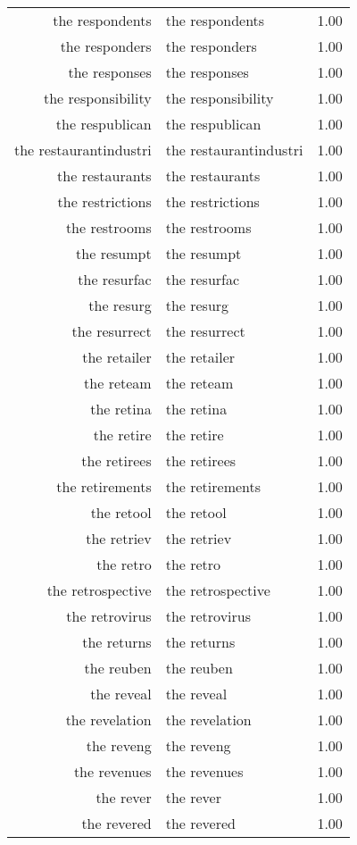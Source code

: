 \begin{table}[ht]
\begin{tabular}{rlr}
  the respondents & the respondents & 1.00 \\ 
  the responders & the responders & 1.00 \\ 
  the responses & the responses & 1.00 \\ 
  the responsibility & the responsibility & 1.00 \\ 
  the respublican & the respublican & 1.00 \\ 
  the restaurantindustri & the restaurantindustri & 1.00 \\ 
  the restaurants & the restaurants & 1.00 \\ 
  the restrictions & the restrictions & 1.00 \\ 
  the restrooms & the restrooms & 1.00 \\ 
  the resumpt & the resumpt & 1.00 \\ 
  the resurfac & the resurfac & 1.00 \\ 
  the resurg & the resurg & 1.00 \\ 
  the resurrect & the resurrect & 1.00 \\ 
  the retailer & the retailer & 1.00 \\ 
  the reteam & the reteam & 1.00 \\ 
  the retina & the retina & 1.00 \\ 
  the retire & the retire & 1.00 \\ 
  the retirees & the retirees & 1.00 \\ 
  the retirements & the retirements & 1.00 \\ 
  the retool & the retool & 1.00 \\ 
  the retriev & the retriev & 1.00 \\ 
  the retro & the retro & 1.00 \\ 
  the retrospective & the retrospective & 1.00 \\ 
  the retrovirus & the retrovirus & 1.00 \\ 
  the returns & the returns & 1.00 \\ 
  the reuben & the reuben & 1.00 \\ 
  the reveal & the reveal & 1.00 \\ 
  the revelation & the revelation & 1.00 \\ 
  the reveng & the reveng & 1.00 \\ 
  the revenues & the revenues & 1.00 \\ 
  the rever & the rever & 1.00 \\ 
  the revered & the revered & 1.00 \\ 

\end{tabular}
\end{table}
